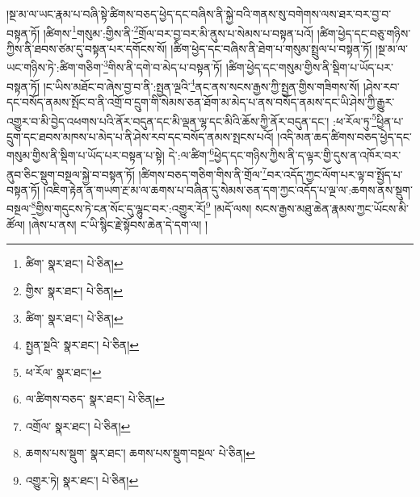 །སྔ་མ་ལ་ཡང་རྣམ་པ་བཞི་སྟེ་ཚིགས་བཅད་ཕྱེད་དང་བཞིས་ནི་སྐྱེ་བའི་གནས་སུ་བགེགས་ལས་ཐར་བར་བྱ་བ་བསྟན་ཏོ། །ཚིགས་\footnote{ཚིག་  སྣར་ཐང་།  པེ་ཅིན། }གསུམ་:གྱིས་ནི་\footnote{གྱིས་  སྣར་ཐང་།  པེ་ཅིན། }གྲོལ་བར་བྱ་བར་མི་ནུས་པ་སེམས་པ་བསྟན་པའོ། །ཚིག་ཕྱེད་དང་བཅུ་གཉིས་ཀྱིས་ནི་ཐབས་ཙམ་དུ་བསྟན་པར་དགོངས་སོ། །ཚིག་ཕྱེད་དང་བཞིས་ནི་ཐེག་པ་གསུམ་སྤྲུལ་པ་བསྟན་ཏོ། །སྔ་མ་ལ་ཡང་གཉིས་ཏེ་:ཚིག་གཅིག་\footnote{ཚིག་  སྣར་ཐང་།  པེ་ཅིན། }གིས་ནི་དགེ་བ་མེད་པ་བསྟན་ཏོ། །ཚིག་ཕྱེད་དང་གསུམ་གྱིས་ནི་སྡིག་པ་ཡོད་པར་བསྟན་ཏོ། །ང་ཡིས་མཐོང་བ་ཞེས་བྱ་བ་ནི་:སྤྱན་ལྔའི་\footnote{སྤྱན་སྔའི་  སྣར་ཐང་།  པེ་ཅིན། }ནང་ནས་སངས་རྒྱས་ཀྱི་སྤྱན་གྱིས་གཟིགས་སོ། །ཤེས་རབ་དང་བསོད་ནམས་སྤོང་བ་ནི་འགྲོ་བ་དྲུག་གི་སེམས་ཅན་ཐོག་མ་མེད་པ་ནས་བསོད་ནམས་དང་ཡི་ཤེས་ཀྱི་རྒྱུར་འགྱུར་བ་མི་བྱེད་འཕགས་པའི་ནོར་བདུན་དང་མི་ལྡན་ལྷ་དང་མིའི་ཆོས་ཀྱི་ནོར་བདུན་དང་། :ཕ་རོལ་ཏུ་\footnote{ཕ་རོལ་  སྣར་ཐང་། }ཕྱིན་པ་དྲུག་དང་ཐབས་མཁས་པ་མེད་པ་ནི་ཤེས་རབ་དང་བསོད་ནམས་སྤངས་པའོ། །འདི་མན་ཆད་ཚིགས་བཅད་ཕྱེད་དང་གསུམ་གྱིས་ནི་སྡིག་པ་ཡོད་པར་བསྟན་པ་སྟེ། དེ་:ལ་ཚིག་\footnote{ལ་ཚིགས་བཅད་  སྣར་ཐང་།  པེ་ཅིན། }ཕྱེད་དང་གཉིས་ཀྱིས་ནི་ད་ལྟར་གྱི་དུས་ན་འཁོར་བར་ནུབ་ཅིང་སྡུག་བསྔལ་སྐྱེ་བ་བསྟན་ཏོ། །ཚིགས་བཅད་གཅིག་གིས་ནི་གྲོལ་\footnote{འགྲོལ་  སྣར་ཐང་།  པེ་ཅིན། }བར་འདོད་ཀྱང་ལོག་པར་ལྟ་བ་སྤྱོད་པ་བསྟན་ཏོ། །འཇིག་རྟེན་ན་གཡག་རྔ་མ་ལ་ཆགས་པ་བཞིན་དུ་སེམས་ཅན་དག་ཀྱང་འདོད་པ་ལྔ་ལ་:ཆགས་ནས་སྡུག་བསྔལ་\footnote{ཆགས་པས་སྡུག་  སྣར་ཐང་། ཆགས་པས་སྡུག་བསྔལ་  པེ་ཅིན། }གྱིས་གདུངས་ཏེ་ངན་སོང་དུ་ལྷུང་བར་:འགྱུར་རོ།\footnote{འགྱུར་ཏེ།  སྣར་ཐང་།  པེ་ཅིན། } །མདོ་ལས། སངས་རྒྱས་མཐུ་ཆེན་རྣམས་ཀྱང་ཡོངས་མི་ཚོལ། །ཞེས་པ་ནས། ང་ཡི་སྙིང་རྗེ་སྟོབས་ཆེན་དེ་དག་ལ། །
